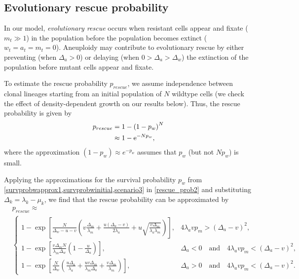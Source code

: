 \documentclass[12pt]{extarticle}
\newcommand{\e}{{\rm e}}
\begin{document}
\subsection*{Evolutionary rescue probability}

In our model, \emph{evolutionary rescue} occurs when resistant cells appear and fixate ($m_t \gg 1$) in the population before the population becomes extinct ($w_t=a_t=m_t=0$).
Aneuploidy may contribute to evolutionary rescue by either preventing (when $\Delta_a>0$) or delaying (when $0>\Delta_a>\Delta_w$) the extinction of the population before mutant cells appear and fixate.

To estimate the rescue probability $p_{rescue}$, we assume independence between clonal lineages starting from an initial population of $N$ wildtype cells (we check the effect of density-dependent growth on our results below).
Thus, the rescue probability is given by 
\begin{subequations}
\begin{align}
p_{rescue} &= 1-\left(1-p_w\right)^N \label{rescue_prob} \\
& \approx 1-\e^{-Np_w} , \label{rescue_prob2}
\end{align}
\end{subequations}
where the approximation $(1-p_w)\approx e^{-p_w}$ assumes that $p_w$ (but not $N p_w$) is small.

Applying the approximations for the survival probability $p_w$ from \cref{survprobwapprox1,survprobwinitial,scenario3} in \cref{rescue_prob2} and substituting $\Delta_k=\lambda_k-\mu_k$, we find that the rescue probability can be approximated by
\begin{equation}\label{rescue_prob_approx}
\begin{aligned}
&p_{rescue} \approx \\
  &\begin{cases}
  1-\exp\left[\frac{N}{\Delta_w-u-v}\left(v\frac{\Delta_m}{\lambda_m}+\frac{u\left(\Delta_a-v\right)}{2\lambda_a}+u\sqrt{\frac{v\Delta_m}{\lambda_a\lambda_m}}\right)\right] ,&
  4\lambda_avp_m>\left(\Delta_a-v\right)^2 ,\\
   1-\exp\left[\frac{v\Delta_mN}{\lambda_m\Delta_w}\left(1-\frac{u}{\Delta_a}\right)\right] ,&
   \Delta_a<0\quad\text{and}\quad4\lambda_avp_m<\left(\Delta_a-v\right)^2 ,\\
   1-\exp\left[\frac{N}{\Delta_w}\left(\frac{u\Delta_a}{\lambda_a}+\frac{uv\Delta_m}{\lambda_m\Delta_a}+\frac{v\Delta_m}{\lambda_m}\right)\right] ,&
   \Delta_a>0\quad\text{and}\quad4\lambda_avp_m<\left(\Delta_a-v\right)^2 .
  \end{cases}
\end{aligned}
\end{equation}
\end{document}
